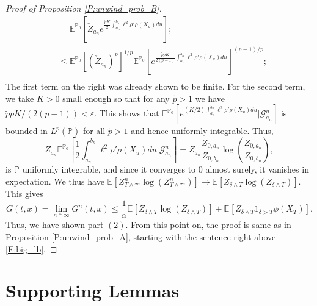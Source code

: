\documentclass[11pt, letterpaper]{amsart}
\theoremstyle{definition}
\theoremstyle{remark}
\numberwithin{equation}{section}
\newcommand{\eps}{\varepsilon}
\newcommand{\prob}{\mathbb{P}}
\newcommand{\esp}{\mathbb{E}}
\newcommand{\espalt}[2]{\esp^{#1}\bra{#2}}
\newcommand{\G}{\mathcal{G}}
\newcommand{\condespalt}[3]{\esp^{#1}\bra{#2\big| #3}}
\newcommand{\bra}[1]{\left[#1\right]}
\begin{document}
\begin{proof}[Proof of Proposition \ref{P:unwind_prob_B}]
\begin{equation*}
\begin{split}
&= \espalt{\prob_0}{\check{Z}_{a_n}e^{\frac{\tilde{p}K}{2}\int_{a_n}^{b_n} \ell^2\rho'\rho(X_u)du}};\\
&\leq \espalt{\prob_0}{\left(\check{Z}_{a_n}\right)^p}^{1/p}\espalt{\prob_0}{e^{\frac{\tilde{p}pK}{2(p-1)}\int_{a_n}^{b_n} \ell^2\rho'\rho(X_u)du}}^{(p-1)/p};\\
\end{split}
\end{equation*}
The first term on the right was already shown to be finite.  For the second term, we take $K>0$ small enough so that for any $\tilde{p}>1$ we have $\tilde{p}pK/(2(p-1)) < \eps$.  This shows that $\condespalt{\prob_0}{e^{(K/2)\int_{a_n}^{b_n} \ell^2\rho'\rho(X_u)du}}{\G^n_{a_n}}$ is bounded in $L^{\tilde{p}}(\prob)$ for all $\tilde{p}>1$ and hence uniformly integrable. Thus,
\begin{equation*}
Z_{a_n}\condespalt{\prob_0}{\frac{1}{2}\int_{a_n}^{b_n} \ell^2\rho'\rho(X_u)du}{\G^n_{a_n}} = Z_{a_n}\frac{Z_{0,a_n}}{Z_{0,b_n}}\log\left(\frac{Z_{0,a_n}}{Z_{0,b_n}}\right),
\end{equation*}
is $\prob$ uniformly integrable, and since it converges to $0$ almost surely, it vanishes in expectation. We thus have $\espalt{}{Z^n_{T\wedge\tau^n}\log(Z^n_{T\wedge\tau^n})} \rightarrow \espalt{}{Z_{\delta\wedge T}\log(Z_{\delta\wedge T})}$. This gives
\begin{equation*}
G(t,x) = \lim_{n\uparrow\infty} G^n(t,x) \leq \frac{1}{\alpha}\espalt{}{Z_{\delta\wedge T}\log\left(Z_{\delta\wedge T}\right)} + \espalt{}{Z_{\delta\wedge T}1_{\delta>T}\phi(X_T)}.
\end{equation*}
Thus, we have shown part $(2)$. From this point on, the proof is same as in Proposition \ref{P:unwind_prob_A}, starting with the sentence right above \eqref{E:big_lb}.
\end{proof}

\appendix

\section{Supporting Lemmas}\label{S:lemmas}

\end{document}
